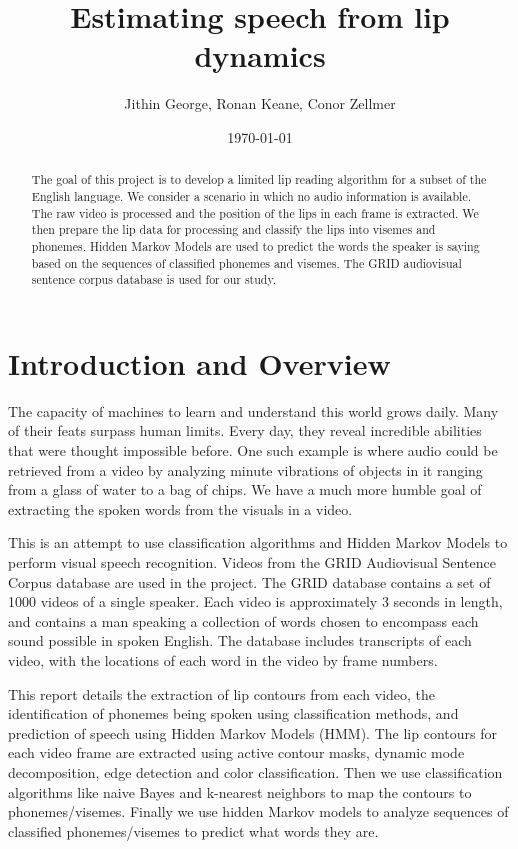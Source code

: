 \documentclass[a4paper]{article}
\title{Estimating speech from lip dynamics}
\author{Jithin George, Ronan Keane, Conor Zellmer}
\date{\today}
\begin{document}
\maketitle

\begin{abstract}
The goal of this project is to develop a limited lip reading algorithm for a subset of the English language. We consider a scenario in which no audio information is available. The raw video is processed and the position of the lips in each frame is extracted. We then prepare the lip data for processing and classify the lips into visemes and phonemes. Hidden Markov Models are used to predict the words the speaker is saying based on the sequences of classified phonemes and visemes. The GRID audiovisual sentence corpus \cite{key-10}\cite{key-11} database is used for our study. 
\end{abstract}

\section{Introduction and Overview}
\label{sec:introduction}

The capacity of machines to learn and understand this world grows daily. Many of their feats surpass human limits. Every day, they reveal incredible abilities that were thought impossible before. One such example is \cite{key-1} where audio could be retrieved from a video by analyzing minute vibrations of objects in it ranging from a glass of water to a bag of chips. We have a much more humble goal of extracting the spoken words from the visuals in a video.


This is an attempt to use classification algorithms and Hidden Markov Models to perform visual speech recognition.  Videos from the GRID Audiovisual Sentence Corpus database \cite{key-10}\cite{key-11}  are used in the project. The GRID database contains a set of 1000 videos of a single speaker. Each video is approximately 3 seconds in length, and contains a man speaking a collection of words chosen to encompass each sound possible in spoken English. The database includes transcripts of each video, with the locations of each word in the video by frame numbers.  

This report details the extraction of lip contours from each video, the identification of phonemes being spoken using classification methods, and prediction of speech using Hidden Markov Models (HMM).  The lip contours for each video frame are extracted using active contour masks, dynamic mode decomposition, edge detection and color classification. Then we use classification algorithms like naive Bayes and k-nearest neighbors to map the contours to phonemes/visemes.  Finally we use hidden Markov models to analyze sequences of classified phonemes/visemes to predict what words they are.   
\end{document}
